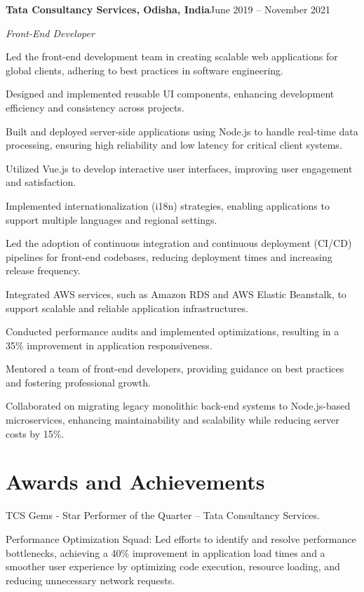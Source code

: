 \documentclass[11pt,a4paper]{article}
\newenvironment{resume_list}{%
  \begin{itemize}[leftmargin=1.5em, topsep=2pt, itemsep=0pt, parsep=0pt]
}{%
  \end{itemize}
}
\newcommand{\headingBf}[2]{%
  \textbf{#1}\hfill #2\par
}
\newcommand{\headingIt}[2]{%
  \textit{#1}\hfill #2\par
}
\begin{document}
\headingBf{Tata Consultancy Services, Odisha, India}{June 2019 -- November 2021}
\headingIt{Front-End Developer}{}
\begin{resume_list}
    \item Led the front-end development team in creating scalable web applications for global clients, adhering to best practices in software engineering.
    \item Designed and implemented reusable UI components, enhancing development efficiency and consistency across projects.
    \item Built and deployed server-side applications using Node.js to handle real-time data processing, ensuring high reliability and low latency for critical client systems.
    \item Utilized Vue.js to develop interactive user interfaces, improving user engagement and satisfaction.
    \item Implemented internationalization (i18n) strategies, enabling applications to support multiple languages and regional settings.
    \item Led the adoption of continuous integration and continuous deployment (CI/CD) pipelines for front-end codebases, reducing deployment times and increasing release frequency.
    \item Integrated AWS services, such as Amazon RDS and AWS Elastic Beanstalk, to support scalable and reliable application infrastructures.
    \item Conducted performance audits and implemented optimizations, resulting in a 35\% improvement in application responsiveness.
    \item Mentored a team of front-end developers, providing guidance on best practices and fostering professional growth.
    \item Collaborated on migrating legacy monolithic back-end systems to Node.js-based microservices, enhancing maintainability and scalability while reducing server costs by 15\%.
\end{resume_list}

\section*{Awards and Achievements}

\begin{resume_list}
    \item TCS Gems - Star Performer of the Quarter – Tata Consultancy Services.
    \item Performance Optimization Squad: Led efforts to identify and resolve performance bottlenecks, achieving a 40\% improvement in application load times and a smoother user experience by optimizing code execution, resource loading, and reducing unnecessary network requests.
\end{resume_list}
\end{document}
